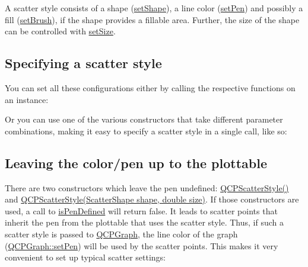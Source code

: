 A scatter style consists of a shape (\hyperlink{classQCPScatterStyle_a7c641c4d4c6d29cb705d3887cfce91c1}{set\+Shape}), a line color (\hyperlink{classQCPScatterStyle_a761f1f229cc0ca4703e1e2b89f6dd1ba}{set\+Pen}) and possibly a fill (\hyperlink{classQCPScatterStyle_a74d692aaeb8d4b36d6f7d510e44264b1}{set\+Brush}), if the shape provides a fillable area. Further, the size of the shape can be controlled with \hyperlink{classQCPScatterStyle_aaefdd031052892c4136129db68596e0f}{set\+Size}.\hypertarget{classQCPScatterStyle_QCPScatterStyle-defining}{}\subsection{Specifying a scatter style}\label{classQCPScatterStyle_QCPScatterStyle-defining}
You can set all these configurations either by calling the respective functions on an instance\+: 
\begin{DoxyCodeInclude}
\end{DoxyCodeInclude}
 Or you can use one of the various constructors that take different parameter combinations, making it easy to specify a scatter style in a single call, like so\+: 
\begin{DoxyCodeInclude}
\end{DoxyCodeInclude}
 \hypertarget{classQCPScatterStyle_QCPScatterStyle-undefinedpen}{}\subsection{Leaving the color/pen up to the plottable}\label{classQCPScatterStyle_QCPScatterStyle-undefinedpen}
There are two constructors which leave the pen undefined\+: \hyperlink{classQCPScatterStyle_a8836018d9ad83ccd8870de8315c1be73}{Q\+C\+P\+Scatter\+Style()} and \hyperlink{classQCPScatterStyle_a003d92f74f4561eda111862eadd62f28}{Q\+C\+P\+Scatter\+Style(\+Scatter\+Shape shape, double size)}. If those constructors are used, a call to \hyperlink{classQCPScatterStyle_a7f1385a8d5e4f349a6b8030723fbd0f7}{is\+Pen\+Defined} will return false. It leads to scatter points that inherit the pen from the plottable that uses the scatter style. Thus, if such a scatter style is passed to \hyperlink{classQCPGraph}{Q\+C\+P\+Graph}, the line color of the graph (\hyperlink{classQCPAbstractPlottable_ab74b09ae4c0e7e13142fe4b5bf46cac7}{Q\+C\+P\+Graph\+::set\+Pen}) will be used by the scatter points. This makes it very convenient to set up typical scatter settings\+:


